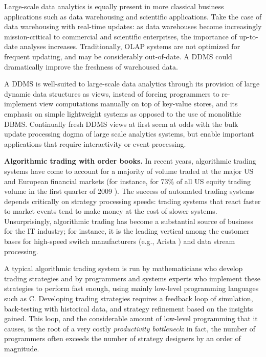 Large-scale data analytics is equally present in more classical business
applications such as data warehousing and scientific applications. Take the
case of data warehousing with real-time updates: as data warehouses become
increasingly mission-critical to commercial and scientific enterprises, the
importance of up-to-date analyses increases. Traditionally, OLAP systems are not
optimized for frequent updating, and may be considerably out-of-date. A DDMS 
could dramatically improve the freshness of warehoused data.

A DDMS is well-suited to large-scale data analytics through its provision of
large dynamic data structures as views, instead of forcing programmers to
re-implement view computations manually on top of key-value stores, and its
emphasis on simple lightweight systems as opposed to the use of monolithic DBMS.
Continually fresh DDMS views at first seem at odds with the bulk update
processing dogma of large scale analytics systems, but enable important
applications that require interactivity or event processing.


\medskip


{\bf Algorithmic trading with order books.}\/
In recent years, algorithmic trading systems have come to account for a majority
of volume traded at the major US and European financial markets (for instance,
for 73\% of all US equity trading volume in the first quarter of 2009
\cite{Iati2009}). The success of automated trading systems depends critically on
strategy processing speeds: trading systems that react faster to market events
tend to make money at the cost of slower systems. Unsurprisingly, algorithmic
trading has become a substantial source of business for the IT industry; for
instance, it is the leading vertical among the customer bases for high-speed
switch manufacturers (e.g., Arista \cite{Becht2010}) and data stream processing.




A typical algorithmic trading system is run by mathematicians who develop
trading strategies and by programmers and systems experts who implement these
strategies to perform fast enough, using mainly low-level programming languages
such as C. Developing trading strategies requires a feedback loop of simulation,
back-testing with historical data, and strategy refinement based on the insights
gained. This loop, and the considerable amount of low-level programming that it
causes, is the root of a very costly {\em productivity bottleneck}\/: in fact,
the number of programmers often exceeds the number of strategy designers by
an order of magnitude.


